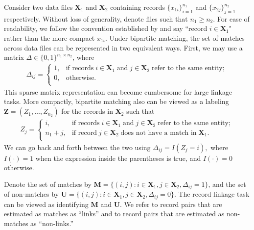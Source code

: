 \documentclass[ba]{imsart}
\begin{document}
Consider two data files $\bm{X}_1$ and $\bm{X}_2$ containing records $\{x_{1i}\}_{i=1}^{n_1}$ and $\{x_{2j}\}_{j=1}^{n_2}$ respectively. Without loss of generality, denote files such that $n_1 \geq n_2$. For ease of readability, we follow the convention established by \cite{sadinle_bayesian_2017} and say ``record $i \in \bm{X}_1$" rather than the more compact $x_{1i}$. Under bipartite matching, the set of matches across data files can be represented in two equivalent ways. First, we may use a matrix $\Delta \in \{0, 1\}^{n_1 \times n_2}$, where
\begin{align}
	\Delta_{ij} =
	\begin{cases}
		1, & \text{if records}\;  i \in \bm{X}_1 \; \text{and}\; j\in \bm{X}_2 \; \text{refer to the same entity}; \\
		0, & \text{otherwise}.\\
	\end{cases}
\end{align}
This sparse matrix representation can become cumbersome for large linkage tasks. More compactly, bipartite matching also can be viewed as a labeling $\bm{Z} = (Z_1, \ldots, Z_{n_2})$ for the records in $\bm{X}_2$ such that 
\begin{align}
	Z_{j} =
	\begin{cases}
		i, & \text{if records}\;  i \in \bm{X}_1 \; \text{and}\; j\in \bm{X}_2 \; \text{refer to the same entity}; \\
		n_1 + j, & \text{if record}\;  j \in \bm{X}_2 \; \text{does not have a match in}\; \bm{X}_1. \\
	\end{cases}
\end{align}
We can go back and forth between the two using $\Delta_{ij} = I(Z_j = i),$ where $I(\cdot) = 1$ when the expression inside the parentheses is true, and $I(\cdot) = 0$ otherwise. 

Denote the set of matches by $\bm{M} = \{(i,j): i \in \bm{X}_1, j \in \bm{X}_2, \Delta_{ij} = 1\}$, and the set of non-matches by 
$\bm{U} =  \{(i,j): i \in \bm{X}_1, j \in \bm{X}_2, \Delta_{ij} = 0\}.$ The record linkage task can be viewed as identifying  $\bm{M}$ and  $\bm{U}.$ We refer to record pairs that are estimated as matches as ``links'' and to record pairs that are estimated as non-matches as ``non-links.''

\end{document}
